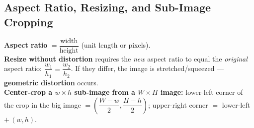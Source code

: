 \documentclass[12pt, a4paper]{article}
\newenvironment{answerbox}{\begin{mdframed}[style=answerframe]}{\end{mdframed}}
\begin{document}
\subsection{Aspect Ratio, Resizing, and Sub-Image Cropping}
\begin{answerbox}
\textbf{Aspect ratio} $= \dfrac{\text{width}}{\text{height}}$ (unit length or pixels). \\
\textbf{Resize without distortion} requires the \emph{new} aspect ratio to equal the \emph{original} aspect ratio: $\dfrac{w_1}{h_1} = \dfrac{w_2}{h_2}$. If they differ, the image is stretched/squeezed — \textbf{geometric distortion} occurs. \\
\textbf{Center-crop a $w\times h$ sub-image from a $W\times H$ image:} lower-left corner of the crop in the big image $= \left(\dfrac{W-w}{2}, \dfrac{H-h}{2}\right)$; upper-right corner $=$ lower-left $+\,(w,h)$.
\end{answerbox}

\end{document}
